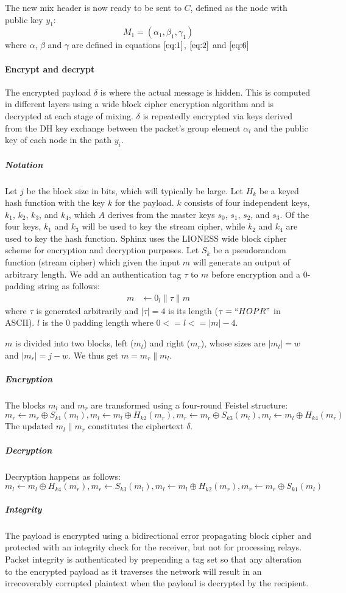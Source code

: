 The new mix header is now ready to be sent to $C$, defined as the node with public key $y_1$:
$$M_1=(\alpha_1,\beta_1,\gamma_1)$$
where $\alpha$, $\beta$ and $\gamma$ are defined in equations $\ref{eq:1}$, $\ref{eq:2}$ and $\ref{eq:6}$
\paragraph{Encrypt and decrypt}
The encrypted payload $\delta$ is where the actual message is hidden. This is computed in different layers using a wide block cipher encryption algorithm and is decrypted at each stage of mixing.
$\delta$ is repeatedly encrypted via keys derived from the DH key exchange between the packet’s group element $\alpha_i$ and the public key of each node in the path $y_i$.

\subparagraph{Notation}
Let $j$ be the block size in bits, which will typically be large. Let $H_k$ be a keyed hash function with the key $k$ for the payload. $k$ consists of four independent keys, $k_1$, $k_2$, $k_3$, and $k_4$, which $A$ derives from the master keys $s_0$, $s_1$, $s_2$, and $s_3$. Of the four keys, $k_1$ and $k_3$ will be used to key the stream cipher, while $k_2$ and $k_4$ are used to key the hash function. Sphinx uses the LIONESS wide block cipher scheme for encryption and decryption purposes.
Let $S_k$ be a pseudorandom function (stream cipher) which given the input $m$ will generate an output of arbitrary length. We add an authentication tag $\tau$ to $m$ before encryption and a 0-padding string as follows:
\begin{align}
   m &\leftarrow 0_{l} \|\tau\|m
    \end{align}
where $\tau$ is generated arbitrarily and $|\tau|=4$ is its length ($\tau=``HOPR "$ in ASCII). $l$ is the $0$ padding length where
$0 <= l <= |m| - 4$.

$m$ is divided into two blocks, left ($m_l$) and right ($m_r$), whose sizes are $|m_l|=w$ and $|m_r|=j-w$. We thus get $m=m_r\|m_l$.
\subparagraph{Encryption}
The blocks $m_l$ and $m_r$ are transformed using a four-round Feistel structure:
$$m_r\leftarrow m_r \oplus S_{k1}(m_l), m_l\leftarrow m_l \oplus H_{k2}(m_r), m_r\leftarrow m_r\oplus S_{k3}(m_l), m_l\leftarrow m_l\oplus H_{k4}(m_r)$$
The updated $m_l\|m_r$ constitutes the ciphertext $\delta$.
\subparagraph{Decryption} Decryption happens as follows:
$$m_l\leftarrow m_l\oplus H_{k4}(m_r), m_r\leftarrow S_{k3}(m_l), m_l\leftarrow m_l\oplus H_{k2}(m_r), m_r\leftarrow m_r\oplus S_{k1}(m_l)$$
\subparagraph{Integrity}
The payload is encrypted using a bidirectional error propagating block cipher
and protected with an integrity check for the receiver, but not
for processing relays. Packet integrity is authenticated by prepending a tag set so that any alteration to the encrypted payload as it traverses the network will result in an irrecoverably corrupted plaintext when the payload is decrypted by the recipient.

